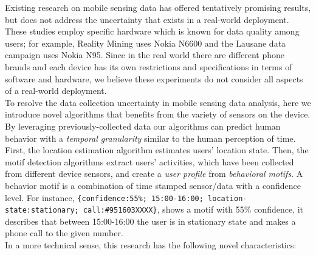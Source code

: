 \documentclass{sig-alternate}
\begin{document}
Existing research \cite{realitymining, lausane} on mobile sensing data has offered tentatively promising results, but does not address the uncertainty that exists in a real-world deployment. These studies employ specific hardware which is known for data quality among users; for example, Reality Mining \cite{realitymining} uses Nokia N6600 and the Lausane data campaign \cite{lausane} uses Nokia N95. Since in the real world there are different phone brands and each device has its own restrictions and specifications in terms of software and hardware, we believe these experiments do not consider all aspects of a real-world deployment. \\
To resolve the data collection uncertainty in mobile sensing data analysis, here we introduce novel algorithms that benefits from the variety of sensors on the device. By leveraging previously-collected data our algorithms can predict human behavior with a \emph{temporal granularity} similar to the human perception of time. First, the location estimation algorithm estimates users' location state. Then, the motif detection algorithms extract users' activities, which have been collected from different device sensors, and create a \emph{user profile} from \emph{behavioral motifs}. A behavior motif is a combination of time stamped sensor/data with a confidence level. For instance, \texttt{\{confidence:55\%; 15:00-16:00; location-state:stationary; call:\#{}951603XXXX\}}, shows a motif with 55\% confidence, it describes that between 15:00-16:00 the user is in stationary state and makes a phone call to the given number. \\ In a more technical sense, this research has the following novel characteristics:
\vspace{-0.1cm}
\end{document}
